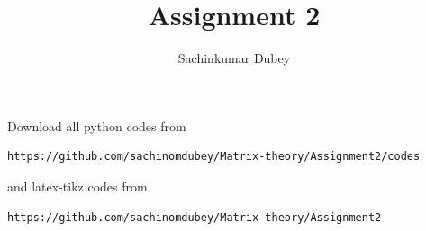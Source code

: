 \documentclass[journal,12pt,twocolumn]{IEEEtran}
\begin{document}
\def\putbox#1#2#3{\makebox[0in][l]{\makebox[#1][l]{}\raisebox{\baselineskip}[0in][0in]{\raisebox{#2}[0in][0in]{#3}}}}
     \def\rightbox#1{\makebox[0in][r]{#1}}
     \def\centbox#1{\makebox[0in]{#1}}
     \def\topbox#1{\raisebox{-\baselineskip}[0in][0in]{#1}}
     \def\midbox#1{\raisebox{-0.5\baselineskip}[0in][0in]{#1}}
\vspace{3cm}
\title{Assignment 2}
\author{Sachinkumar Dubey}

\maketitle
\newpage

\bigskip
\renewcommand{\thefigure}{\theenumi}
\renewcommand{\thetable}{\theenumi}
Download all python codes from 
\begin{lstlisting}
https://github.com/sachinomdubey/Matrix-theory/Assignment2/codes
\end{lstlisting}
%
and latex-tikz codes from 
%
\begin{lstlisting}
https://github.com/sachinomdubey/Matrix-theory/Assignment2
\end{lstlisting}
%
\end{document}
